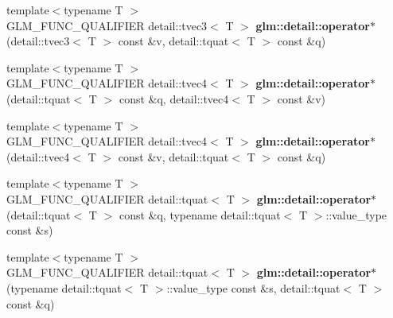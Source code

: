 \begin{DoxyCompactItemize}
\item 
\hypertarget{namespaceglm_1_1detail_ac8613d44bc2e39003a9f9b698ee66132}{{\footnotesize template$<$typename T $>$ }\\\-G\-L\-M\-\_\-\-F\-U\-N\-C\-\_\-\-Q\-U\-A\-L\-I\-F\-I\-E\-R \*
detail\-::tvec3$<$ \-T $>$ {\bfseries glm\-::detail\-::operator$\ast$} (detail\-::tvec3$<$ \-T $>$ const \&v, detail\-::tquat$<$ \-T $>$ const \&q)}\label{namespaceglm_1_1detail_ac8613d44bc2e39003a9f9b698ee66132}

\item 
\hypertarget{namespaceglm_1_1detail_a545f7ff9c0237b044aa7afbaeea454a6}{{\footnotesize template$<$typename T $>$ }\\\-G\-L\-M\-\_\-\-F\-U\-N\-C\-\_\-\-Q\-U\-A\-L\-I\-F\-I\-E\-R \*
detail\-::tvec4$<$ \-T $>$ {\bfseries glm\-::detail\-::operator$\ast$} (detail\-::tquat$<$ \-T $>$ const \&q, detail\-::tvec4$<$ \-T $>$ const \&v)}\label{namespaceglm_1_1detail_a545f7ff9c0237b044aa7afbaeea454a6}

\item 
\hypertarget{namespaceglm_1_1detail_a05fb6dd823cc933828159a865d0e82c7}{{\footnotesize template$<$typename T $>$ }\\\-G\-L\-M\-\_\-\-F\-U\-N\-C\-\_\-\-Q\-U\-A\-L\-I\-F\-I\-E\-R \*
detail\-::tvec4$<$ \-T $>$ {\bfseries glm\-::detail\-::operator$\ast$} (detail\-::tvec4$<$ \-T $>$ const \&v, detail\-::tquat$<$ \-T $>$ const \&q)}\label{namespaceglm_1_1detail_a05fb6dd823cc933828159a865d0e82c7}

\item 
\hypertarget{namespaceglm_1_1detail_a8cc37205ec17ddd9c7ab8d7ad1485911}{{\footnotesize template$<$typename T $>$ }\\\-G\-L\-M\-\_\-\-F\-U\-N\-C\-\_\-\-Q\-U\-A\-L\-I\-F\-I\-E\-R \*
detail\-::tquat$<$ \-T $>$ {\bfseries glm\-::detail\-::operator$\ast$} (detail\-::tquat$<$ \-T $>$ const \&q, typename detail\-::tquat$<$ \-T $>$\-::value\-\_\-type const \&s)}\label{namespaceglm_1_1detail_a8cc37205ec17ddd9c7ab8d7ad1485911}

\item 
\hypertarget{namespaceglm_1_1detail_aa87e70463fba0101b49aea5d50ff9c0e}{{\footnotesize template$<$typename T $>$ }\\\-G\-L\-M\-\_\-\-F\-U\-N\-C\-\_\-\-Q\-U\-A\-L\-I\-F\-I\-E\-R \*
detail\-::tquat$<$ \-T $>$ {\bfseries glm\-::detail\-::operator$\ast$} (typename detail\-::tquat$<$ \-T $>$\-::value\-\_\-type const \&s, detail\-::tquat$<$ \-T $>$ const \&q)}\label{namespaceglm_1_1detail_aa87e70463fba0101b49aea5d50ff9c0e}


\end{DoxyCompactItemize}
